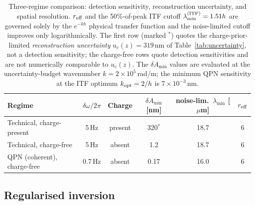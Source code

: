 \documentclass[12pt,a4paper]{article}
\begin{document}
\begin{table}[htb]
\centering
\caption{Three-regime comparison: detection sensitivity, reconstruction
uncertainty, and spatial resolution.  $r_{\rm eff}$ and
the 50\%-of-peak ITF cutoff $\lambda_{\min}^{\rm(ITF)}=1.51h$ are governed
solely by the $e^{-kh}$ physical transfer function and the noise-limited
cutoff improves only logarithmically.  The
first row (marked $^{*}$) quotes the charge-prior-limited
\emph{reconstruction uncertainty} $u_c(z)=319$\,nm of
Table~\ref{tab:uncertainty}, not a detection sensitivity; the
charge-free rows quote detection sensitivities and are not numerically
comparable to $u_c(z)$.  The
$\delta A_{\min}$ values are evaluated at the uncertainty-budget
wavenumber $k=2\times10^5$\,rad/m; the minimum QPN sensitivity at the ITF
optimum $k_{\rm opt}=2/h$ is $7\times10^{-3}$\,nm.}
\label{tab:regimes}
\footnotesize
\setlength{\tabcolsep}{3.5pt}
\begin{tabular}{@{}lccccc@{}}
\hline
Regime & $\delta\omega/2\pi$ & Charge & $\delta A_{\min}$ [nm] & noise-lim.\ $\lambda_{\min}$ [$\mu$m] & $r_{\rm eff}$ \\
\hline
Technical, charge-present            & 5\,Hz   & present & 320$^{*}$  & 18.7 & 6 \\
\hline
Technical, charge-free               & 5\,Hz   & absent  & 1.2  & 18.7 & 6 \\
QPN (coherent), charge-free          & 0.7\,Hz & absent  & 0.17 & 16.0 & 6 \\
\hline
\end{tabular}
\end{table}

\subsection{Regularised inversion}
\end{document}
